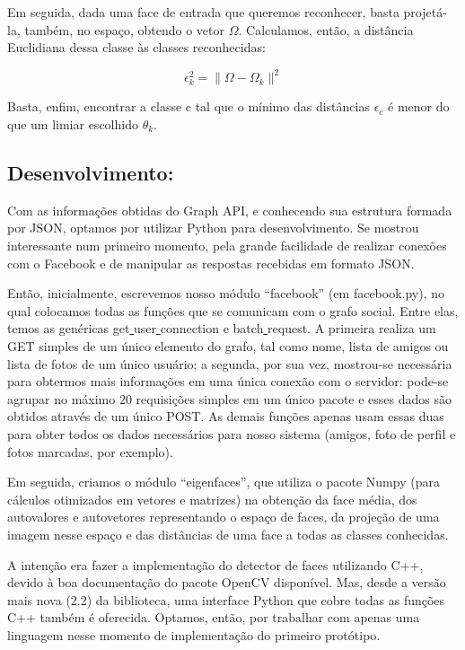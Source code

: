 \documentclass[10pt,a4paper]{article}
\begin{document}
Em seguida, dada uma face de entrada que queremos reconhecer, basta
projetá-la, também, no espaço, obtendo o vetor $\Omega$. Calculamos,
então, a distância Euclidiana dessa classe às classes reconhecidas:

\begin{equation}
  \epsilon_k^2=\|\Omega-\Omega_k\|^2
\end{equation}

Basta, enfim, encontrar a classe c tal que o mínimo das distâncias $\epsilon_c$ é menor do que um limiar escolhido $\theta_k$.


\subsection*{Desenvolvimento:}
	Com as informações obtidas do Graph API, e conhecendo sua estrutura formada por JSON, optamos por utilizar Python para desenvolvimento. Se mostrou interessante num primeiro momento, pela grande facilidade de realizar conexões com o Facebook e de manipular as respostas recebidas em formato JSON.

	Então, inicialmente, escrevemos nosso módulo “facebook” (em facebook.py), no qual colocamos todas as funções que se comunicam com o grafo social. Entre elas, temos as genéricas get\underline{ }user\underline{ }connection e batch\underline{ }request. A primeira realiza um GET simples de um único elemento do grafo, tal como nome, lista de amigos ou lista de fotos de um único usuário; a segunda, por sua vez, mostrou-se necessária para obtermos mais informações em uma única conexão com o servidor: pode-se agrupar no máximo 20 requisições simples em um único pacote e esses dados são obtidos através de um único POST. As demais funções apenas usam essas duas para obter todos os dados necessários para nosso sistema (amigos, foto de perfil e fotos marcadas, por exemplo).

	Em seguida, criamos o módulo “eigenfaces”, que utiliza o pacote Numpy (para cálculos otimizados em vetores e matrizes) na obtenção da face média, dos autovalores e autovetores representando o espaço de faces, da projeção de uma imagem nesse espaço e das distâncias de uma face a todas as classes conhecidas.

	A intenção era fazer a implementação do detector de faces utilizando C++, devido à boa documentação do pacote OpenCV disponível. Mas, desde a versão mais nova (2.2) da biblioteca, uma interface Python que cobre todas as funções C++ também é oferecida. Optamos, então, por trabalhar com apenas uma linguagem nesse momento de implementação do primeiro protótipo.
\end{document}
